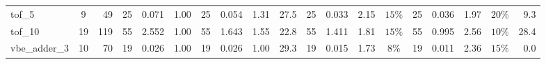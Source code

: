 \begin{table}[H]
\begin{tabular}{l c r | r r r | r r r r | r r r c | r r r c r}
tof\_5 & 9 & 49 & \cellcolor{bestT}25 & 0.071 & 1.00 & \cellcolor{bestT}25 & 0.054 & 1.31 & 27.5 & \cellcolor{bestT}25 & 0.033 & \cellcolor{bestTime}2.15 & $15\%$ & \cellcolor{bestT}25 & 0.036 & 1.97 & $20\%$ & 9.3 \\
tof\_10 & 19 & 119 & \cellcolor{bestT}55 & 2.552 & 1.00 & \cellcolor{bestT}55 & 1.643 & 1.55 & 22.8 & \cellcolor{bestT}55 & 1.411 & 1.81 & $15\%$ & \cellcolor{bestT}55 & 0.995 & \cellcolor{bestTime}2.56 & $10\%$ & 28.4 \\
vbe\_adder\_3 & 10 & 70 & \cellcolor{bestT}19 & 0.026 & 1.00 & \cellcolor{bestT}19 & 0.026 & 1.00 & 29.3 & \cellcolor{bestT}19 & 0.015 & 1.73 & $8\%$ & \cellcolor{bestT}19 & 0.011 & \cellcolor{bestTime}2.36 & $15\%$ & 0.0 \\
\bottomrule
\end{tabular}
\end{table}
